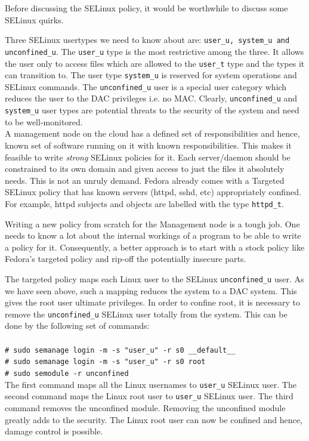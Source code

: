 \documentclass[10pt,twocolumn,pdftex]{article}
\begin{document}
Before discussing the SELinux policy, it would be worthwhile to discuss some SELinux quirks.

Three SELinux usertypes we need to know about are: {\tt user\_u, system\_u and unconfined\_u}. The {\tt user\_u} type is the most restrictive among the three. It allows the user only to access files which are allowed to the {\tt user\_t} type and the types it can transition to. The user type {\tt system\_u} is reserved for system operations and SELinux commands. The {\tt unconfined\_u} user is a special user category which reduces the user to the DAC privileges i.e. no MAC. Clearly, {\tt unconfined\_u} and {\tt system\_u} user types are potential threats to the security of the system and need to be well-monitored.\\

A management node on the cloud has a defined set of responsibilities and hence, known set of software running on it with known responsibilities. This makes it feasible to write \emph{strong} SELinux policies for it. Each server/daemon should be constrained to its own domain and given access to just the files it absolutely needs. This is not an unruly demand. Fedora already comes with a Targeted SELinux policy that has known servers (httpd, sshd, etc) appropriately confined. For example, httpd subjects and objects are labelled with the type {\tt httpd\_t}. 

Writing a new policy from scratch for the Management node is a tough job. One needs to know a lot about the internal workings of a program to be able to write a policy for it. Consequently, a better approach is to start with a stock policy like Fedora's targeted policy and rip-off the potentially insecure parts.

The targeted policy maps each Linux user to the SELinux {\tt unconfined\_u} user. As we have seen above, such a mapping reduces the system to a DAC system. This gives the root user ultimate privileges. In order to confine root, it is necessary to remove the {\tt unconfined\_u} SELinux user totally from the system. This can be done by the following set of commands:\\ \\
{\tt \# sudo semanage login -m -s "user\_u" -r s0 \_\_default\_\_}\\
{\tt \# sudo semanage login -m -s "user\_u" -r s0 root} \\
{\tt \# sudo semodule -r unconfined}\\

The first command maps all the Linux usernames to {\tt user\_u} SELinux user. The second command maps the Linux root user to {\tt user\_u} SELinux user.  The third command removes the unconfined module. Removing the unconfined module greatly adds to the security. The Linux root user can now be confined and hence, damage control is possible.
\end{document}
